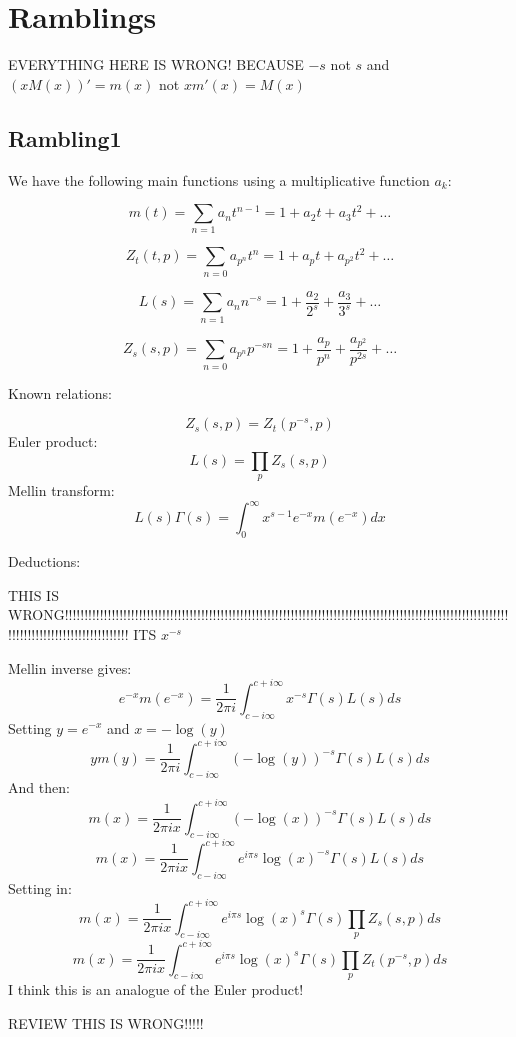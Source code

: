 \documentclass[a4paper]{amsart}
\begin{document}
\section{Ramblings}

EVERYTHING HERE IS WRONG! BECAUSE $-s$ not $s$ and $(xM(x))' = m(x)$ not $xm'(x) = M(x)$


\subsection{Rambling1}

We have the following main functions using a multiplicative function $a_k$:

$$m(t) = \sum_{n = 1} a_nt^{n - 1} = 1 + a_2t + a_3t^2 + \ldots$$

$$Z_t(t, p) = \sum_{n = 0} a_{p^n} t^n = 1 + a_pt + a_{p^2}t^2 + \ldots$$

$$L(s) = \sum_{n = 1} a_n n^{-s} = 1 + \frac{a_2}{2^s} + \frac{a_3}{3^s} + \ldots$$

$$Z_s(s, p) = \sum_{n = 0} a_{p^n} p^{-sn} = 1 + \frac{a_p}{p^n} + \frac{a_{p^2}}{p^{2s}} + \ldots$$

Known relations:

$$Z_s(s, p) = Z_t(p^{-s}, p)$$
Euler product:
$$L(s) = \prod_p Z_s(s, p)$$
Mellin transform:
$$L(s)\Gamma(s) = \int_0^{\infty} x^{s - 1} e^{-x} m(e^{-x})dx$$

Deductions:

THIS IS WRONG!!!!!!!!!!!!!!!!!!!!!!!!!!!!!!!!!!!!!!!!!!!!!!!!!!!!!!!!!!!!!!!!!!!!!!!!!!!!!!!!!!!!!!!!!!!!!!!!!!!!!!!!!!!!!!!!!!!!!!!!!!!!!!!!!!!!!!!!!!!!!!!!!
ITS $x^{-s}$


Mellin inverse gives:
$$e^{-x}m(e^{-x}) = \frac{1}{2\pi i}\int_{c - i\infty}^{c + i\infty}x^{-s} \Gamma(s)L(s)ds$$
Setting $y = e^{-x}$ and $x = -\log(y)$
$$y m(y) = \frac{1}{2\pi i}\int_{c - i\infty}^{c + i\infty}(-\log(y))^{-s} \Gamma(s)L(s)ds$$
And then:
$$m(x) = \frac{1}{2\pi i x} \int_{c - i\infty}^{c + i\infty}(-\log(x))^{-s} \Gamma(s)L(s)ds$$
$$m(x) = \frac{1}{2\pi i x} \int_{c - i\infty}^{c + i\infty}e^{i\pi s}\log(x)^{-s} \Gamma(s)L(s)ds$$
Setting in:
$$m(x) = \frac{1}{2\pi i x} \int_{c - i\infty}^{c + i\infty}e^{i\pi s}\log(x)^s \Gamma(s)\prod_p Z_s(s, p)ds$$
$$m(x) = \frac{1}{2\pi i x} \int_{c - i\infty}^{c + i\infty}e^{i\pi s}\log(x)^s \Gamma(s)\prod_p Z_t(p^{-s}, p)ds$$
I think this is an analogue of the Euler product!

REVIEW THIS IS WRONG!!!!! 
\end{document}
